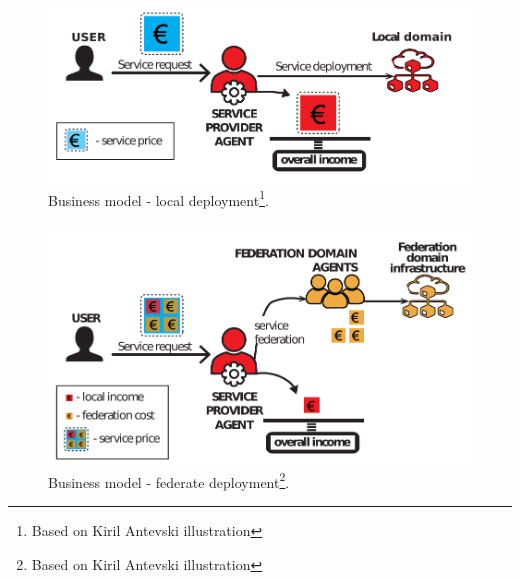 \documentclass[aspectratio=169]{beamer}
\begin{document}
\begin{frame}
    \frametitle{\secname}
    \framesubtitle{\subsecname}

    \begin{figure}
        \centering
        \includegraphics[width=.8\textwidth]{img/local-deploy.pdf}
        \caption{Business model - local deployment\footnote{Based on Kiril Antevski illustration}.}
        \label{fig:local-deploy}
    \end{figure}
\end{frame}



\begin{frame}
    \frametitle{\secname}
    \framesubtitle{\subsecname}

    \begin{figure}
        \centering
        \includegraphics[width=.7\textwidth]{img/federation-deploy.pdf}
        \caption{Business model - federate deployment\footnote{Based on Kiril Antevski illustration}.}
        \label{fig:local-deploy}
    \end{figure}
\end{frame}
\end{document}
